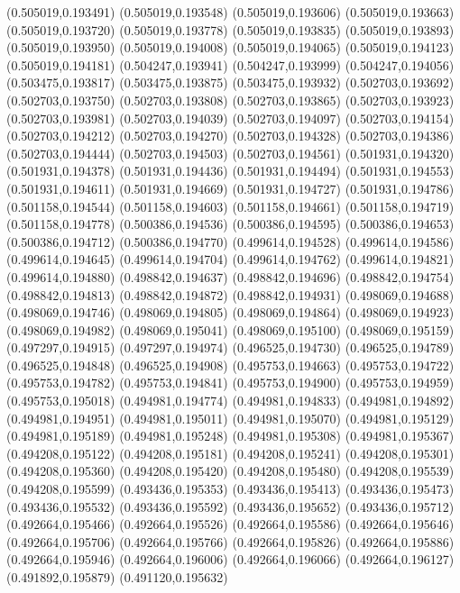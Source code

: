 (0.505019,0.193491)
(0.505019,0.193548)
(0.505019,0.193606)
(0.505019,0.193663)
(0.505019,0.193720)
(0.505019,0.193778)
(0.505019,0.193835)
(0.505019,0.193893)
(0.505019,0.193950)
(0.505019,0.194008)
(0.505019,0.194065)
(0.505019,0.194123)
(0.505019,0.194181)
(0.504247,0.193941)
(0.504247,0.193999)
(0.504247,0.194056)
(0.503475,0.193817)
(0.503475,0.193875)
(0.503475,0.193932)
(0.502703,0.193692)
(0.502703,0.193750)
(0.502703,0.193808)
(0.502703,0.193865)
(0.502703,0.193923)
(0.502703,0.193981)
(0.502703,0.194039)
(0.502703,0.194097)
(0.502703,0.194154)
(0.502703,0.194212)
(0.502703,0.194270)
(0.502703,0.194328)
(0.502703,0.194386)
(0.502703,0.194444)
(0.502703,0.194503)
(0.502703,0.194561)
(0.501931,0.194320)
(0.501931,0.194378)
(0.501931,0.194436)
(0.501931,0.194494)
(0.501931,0.194553)
(0.501931,0.194611)
(0.501931,0.194669)
(0.501931,0.194727)
(0.501931,0.194786)
(0.501158,0.194544)
(0.501158,0.194603)
(0.501158,0.194661)
(0.501158,0.194719)
(0.501158,0.194778)
(0.500386,0.194536)
(0.500386,0.194595)
(0.500386,0.194653)
(0.500386,0.194712)
(0.500386,0.194770)
(0.499614,0.194528)
(0.499614,0.194586)
(0.499614,0.194645)
(0.499614,0.194704)
(0.499614,0.194762)
(0.499614,0.194821)
(0.499614,0.194880)
(0.498842,0.194637)
(0.498842,0.194696)
(0.498842,0.194754)
(0.498842,0.194813)
(0.498842,0.194872)
(0.498842,0.194931)
(0.498069,0.194688)
(0.498069,0.194746)
(0.498069,0.194805)
(0.498069,0.194864)
(0.498069,0.194923)
(0.498069,0.194982)
(0.498069,0.195041)
(0.498069,0.195100)
(0.498069,0.195159)
(0.497297,0.194915)
(0.497297,0.194974)
(0.496525,0.194730)
(0.496525,0.194789)
(0.496525,0.194848)
(0.496525,0.194908)
(0.495753,0.194663)
(0.495753,0.194722)
(0.495753,0.194782)
(0.495753,0.194841)
(0.495753,0.194900)
(0.495753,0.194959)
(0.495753,0.195018)
(0.494981,0.194774)
(0.494981,0.194833)
(0.494981,0.194892)
(0.494981,0.194951)
(0.494981,0.195011)
(0.494981,0.195070)
(0.494981,0.195129)
(0.494981,0.195189)
(0.494981,0.195248)
(0.494981,0.195308)
(0.494981,0.195367)
(0.494208,0.195122)
(0.494208,0.195181)
(0.494208,0.195241)
(0.494208,0.195301)
(0.494208,0.195360)
(0.494208,0.195420)
(0.494208,0.195480)
(0.494208,0.195539)
(0.494208,0.195599)
(0.493436,0.195353)
(0.493436,0.195413)
(0.493436,0.195473)
(0.493436,0.195532)
(0.493436,0.195592)
(0.493436,0.195652)
(0.493436,0.195712)
(0.492664,0.195466)
(0.492664,0.195526)
(0.492664,0.195586)
(0.492664,0.195646)
(0.492664,0.195706)
(0.492664,0.195766)
(0.492664,0.195826)
(0.492664,0.195886)
(0.492664,0.195946)
(0.492664,0.196006)
(0.492664,0.196066)
(0.492664,0.196127)
(0.491892,0.195879)
(0.491120,0.195632)
